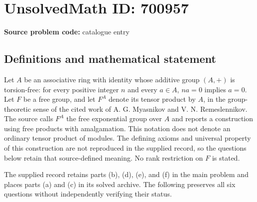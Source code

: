 \documentclass[11pt]{article}
\begin{document}
\section*{UnsolvedMath ID: 700957}
\textbf{Source problem code:} catalogue entry
\subsection{Definitions and mathematical statement}
Let \(A\) be an associative ring with identity whose additive group \((A,+)\) is torsion-free: for every positive integer \(n\) and every \(a\in A\), \(na=0\) implies \(a=0\). Let \(F\) be a free group, and let \(F^A\) denote its tensor product by \(A\), in the group-theoretic sense of the cited work of A. G. Myasnikov and V. N. Remeslennikov. The source calls \(F^A\) the free exponential group over \(A\) and reports a construction using free products with amalgamation. This notation does not denote an ordinary tensor product of modules. The defining axioms and universal property of this construction are not reproduced in the supplied record, so the questions below retain that source-defined meaning. No rank restriction on \(F\) is stated.

The supplied record retains parts (b), (d), (e), and (f) in the main problem and places parts (a) and (c) in its solved archive. The following preserves all six questions without independently verifying their status.
\end{document}
